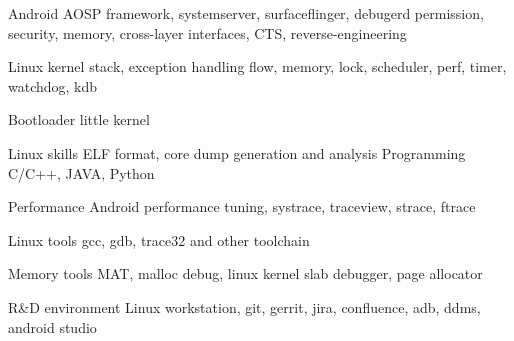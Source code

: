 

\begin{cvskills}

  \cvskill
    {Android AOSP}
    {framework, systemserver, surfaceflinger, debugerd permission, security, memory, cross-layer interfaces, CTS, reverse-engineering}

  \cvskill
    {Linux kernel}
    {stack, exception handling flow, memory, lock, scheduler, perf, timer, watchdog, kdb}

  \cvskill
    {Bootloader}
    {little kernel}

  \cvskill
    {Linux skills}
    {ELF format, core dump generation and analysis}
  \cvskill
    {Programming} %
    {C/C++, JAVA, Python} %

  \cvskill
    {Performance} %
    {Android performance tuning, systrace, traceview, strace, ftrace} %

  \cvskill
    {Linux tools} %
    {gcc, gdb, trace32 and other toolchain} %

  \cvskill
    {Memory tools}
    {MAT, malloc debug, linux kernel slab debugger, page allocator}

  \cvskill
    {R\&D environment}
    {Linux workstation, git, gerrit, jira, confluence, adb, ddms, android studio}

\end{cvskills}
